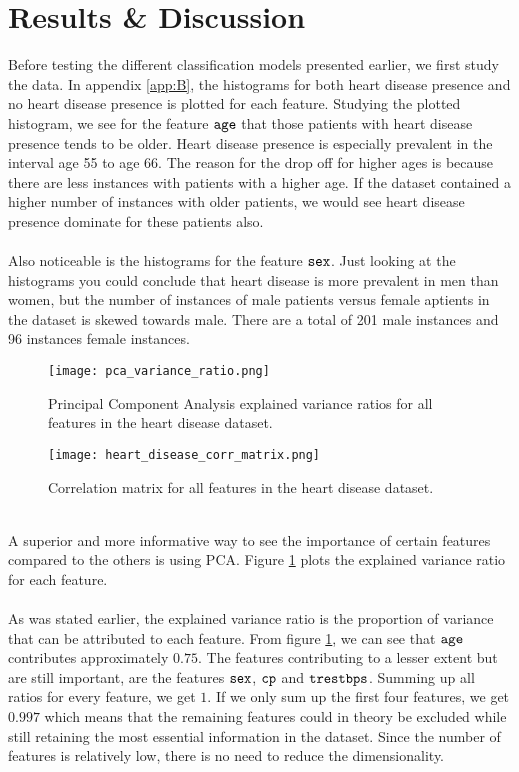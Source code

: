 \documentclass[a4paper,twocolumn]{article}
\begin{document}
\section{Results \& Discussion}
Before testing the different classification models presented earlier, we first study the data. In appendix \ref{app:B}, the histograms for both heart disease presence and no heart disease presence is plotted for each feature. Studying the plotted histogram, we see for the feature $\verb"age"$ that those patients with heart disease presence tends to be older. Heart disease presence is especially prevalent in the interval age 55 to age 66. The reason for the drop off for higher ages is because there are less instances with patients with a higher age. If the dataset contained a higher number of instances with older patients, we would see heart disease presence dominate for these patients also. \\
\\
Also noticeable is the histograms for the feature $\verb"sex"$. Just looking at the histograms you could conclude that heart disease is more prevalent in men than women, but the number of instances of male patients versus female aptients in the dataset is skewed towards male. There are a total of 201 male instances and 96 instances female instances.
\begin{figure}[ht]
    \centering
    \texttt{[image: pca\_variance\_ratio.png]}
    \caption{Principal Component Analysis explained variance ratios for all features in the heart disease dataset.}
    \label{fig:5}
\end{figure}
\begin{figure*}[b]
    \centering
    \texttt{[image: heart\_disease\_corr\_matrix.png]}
    \caption{Correlation matrix for all features in the heart disease dataset.}
    \label{fig:6}
\end{figure*}\\
A superior and more informative way to see the importance of certain features compared to the others is using PCA. Figure \ref{fig:5} plots the explained variance ratio for each feature.\\
\\
As was stated earlier, the explained variance ratio is the proportion of variance that can be attributed to each feature. From figure \ref{fig:5}, we can see that $\verb"age"$ contributes approximately $0.75$. The features contributing to a lesser extent but are still important, are the features $\verb"sex"$, $\verb"cp"$ and $\verb"trestbps"$. Summing up all ratios for every feature, we get $1$. If we only sum up the first four features, we get $0.997$ which means that the remaining features could in theory be excluded while still retaining the most essential information in the dataset. Since the number of features is relatively low, there is no need to reduce the dimensionality.\\
\end{document}
